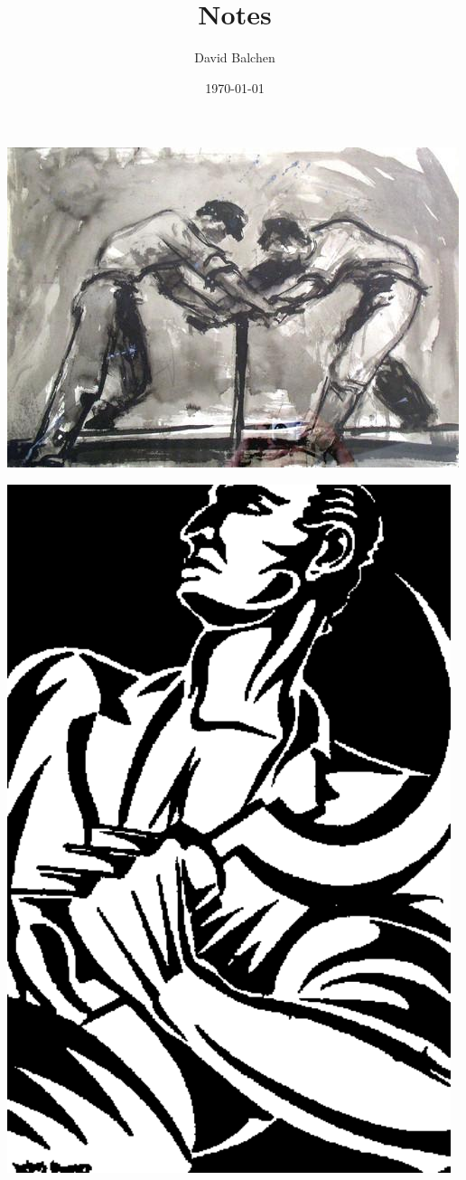 \documentclass[12pt,twoside]{article}
\author{David Balchen}
\date{\today}
\title{Notes}
\begin{document}
\maketitle
{}
\begin{center}
\includegraphics[width=.9\linewidth]{Pictures/Andrejevi1.jpg}
\end{center}
\newpage

\begin{center}
\includegraphics[width=13cm]{Pictures/postal5.png}
\end{center}
\end{document}
